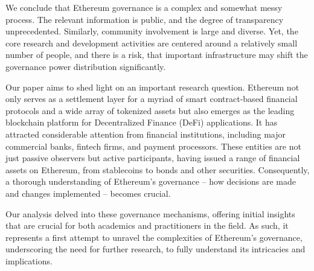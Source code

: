 \documentclass[No]{AEA}
\begin{document}
We conclude that Ethereum governance is a complex and somewhat messy process. The relevant information is public, and the degree of transparency unprecedented. Similarly, community involvement is large and diverse. Yet, the core research and development activities are centered around a relatively small number of people, and there is a risk, that important infrastructure may shift the governance power distribution significantly. 

Our paper aims to shed light on an important research question. Ethereum not only serves as a settlement layer for a myriad of smart contract-based financial protocols and a wide array of tokenized assets but also emerges as the leading blockchain platform for Decentralized Finance (DeFi) applications. 
It has attracted considerable attention from financial institutions, including major commercial banks, fintech firms, and payment processors. These entities are not just passive observers but active participants, having issued a range of financial assets on Ethereum, from stablecoins to bonds and other securities. Consequently, a thorough understanding of Ethereum's governance -- how decisions are made and changes implemented -- becomes crucial. 

Our analysis delved into these governance mechanisms, offering initial insights that are crucial for both academics and practitioners in the field. As such, it represents a first attempt to unravel the complexities of Ethereum's governance, underscoring the need for further research, to fully understand its intricacies and implications.


\newpage


\end{document}
